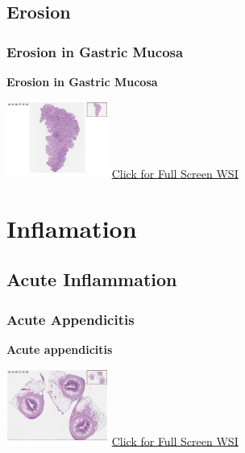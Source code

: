 \documentclass[
  letterpaper,
  paper=6in:9in,
  pagesize=pdftex,
  headinclude=on,
  footinclude=on,
  12pt]{scrbook}
\begin{document}
\hypertarget{sec-erosion}{%
\chapter{Erosion}\label{sec-erosion}}

\hypertarget{sec-erosion-in-gastric-mucosa}{%
\section{Erosion in Gastric
Mucosa}\label{sec-erosion-in-gastric-mucosa}}

\textbf{Erosion in Gastric Mucosa}

\href{https://images.patolojiatlasi.com/erosion/HE.html}{\includegraphics[width=0.25\textwidth,height=\textheight]{./screenshots/erosion_screenshot.png}}
\href{https://images.patolojiatlasi.com/erosion/HE.html}{Click for Full
Screen WSI}

\part{Inflamation}

\hypertarget{sec-acute-inflammation}{%
\chapter{Acute Inflammation}\label{sec-acute-inflammation}}

\hypertarget{sec-acute-appendicitis}{%
\section{Acute Appendicitis}\label{sec-acute-appendicitis}}

\textbf{Acute appendicitis}

\href{https://images.patolojiatlasi.com/acute-appendicitis/HE.html}{\includegraphics[width=0.25\textwidth,height=\textheight]{./screenshots/acute-appendicitis_screenshot.png}}
\href{https://images.patolojiatlasi.com/acute-appendicitis/HE.html}{Click
for Full Screen WSI}
\end{document}

